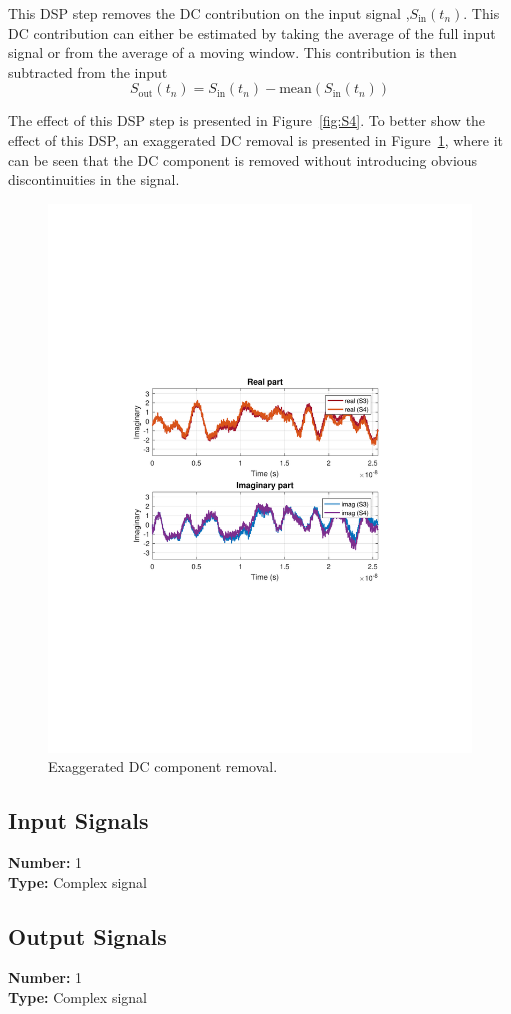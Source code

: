 This DSP step removes the DC contribution on the input signal ,$S_\text{in}(t_n)$. This DC contribution can either be estimated by taking the average of the full input signal or from the average of a moving window. This contribution is then subtracted from the input
\begin{equation}
S_\text{out}(t_n)=S_\text{in}(t_n)-\text{mean}(S_\text{in}(t_n))
\end{equation}
\par
The effect of this DSP step is presented in Figure~\ref{fig:S4}. To better show the effect of this DSP, an exaggerated DC removal is presented in Figure~\ref{fig:S4EXAGERATED}, where it can be seen that the DC component is removed without introducing obvious discontinuities in the signal.
%
\begin{figure}[h]
\centering
\includegraphics[trim={7cm 8cm 7cm 8cm},width=.3\linewidth]{./lib/dc_component_removal/figures/S4EXAGERATED}
\caption{Exaggerated DC component removal.}
\label{fig:S4EXAGERATED}
\end{figure}	
%
\subsection*{Input Signals}

\textbf{Number:} 1\\
\textbf{Type:} Complex signal

\subsection*{Output Signals}

\textbf{Number:} 1\\
\textbf{Type:} Complex signal

